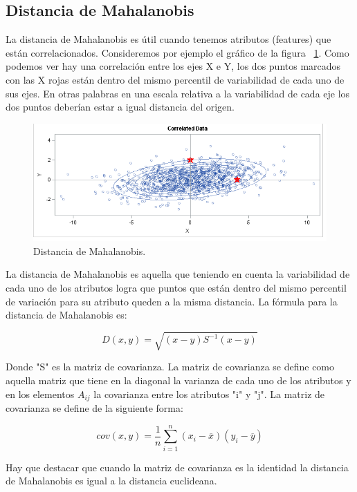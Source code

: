 \subsection{Distancia de Mahalanobis}

La distancia de Mahalanobis es útil cuando tenemos atributos (features) que están correlacionados. Consideremos por ejemplo el gráfico de la figura ~\ref{fig:malahanobis}. Como podemos ver hay una correlación entre los ejes X e Y, los dos puntos marcados con las X rojas están dentro del mismo percentil de variabilidad de cada uno de sus ejes. En otras palabras en una escala relativa a la variabilidad de cada eje los dos puntos deberían estar a igual distancia del origen.

\begin{figure}[!htb]
\centering
\includegraphics[width=5in]{figures/mahalanobis-fig.png}
\caption{Distancia de Mahalanobis.}
\label{fig:malahanobis}

\end{figure}

La distancia de Mahalanobis es aquella que teniendo en cuenta la variabilidad de cada uno de los atributos logra que puntos que están dentro del mismo percentil de variación para su atributo queden a la misma distancia. La fórmula para la distancia de Mahalanobis es:

$$D(x,y) = \sqrt{(x-y)S^{-1}(x-y)}$$

Donde "S" es la matriz de covarianza. La matriz de covarianza se define como aquella matriz que tiene en la diagonal la varianza de cada uno de los atributos y en los elementos $A_{ij}$ la covarianza entre los atributos "i" y "j". La matriz de covarianza se define de la siguiente forma:

$$ cov(x,y) = \frac{1}{n} \sum_{i=1}^{n} (x_i-\overline{x})(y_i-\overline{y})$$

Hay que destacar que cuando la matriz de covarianza es la identidad la distancia de Mahalanobis es igual a la distancia euclideana.

